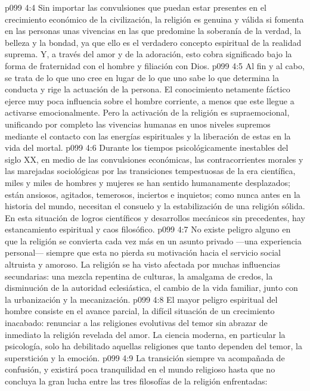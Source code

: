 \vs p099 4:4 Sin importar las convulsiones que puedan estar presentes en el crecimiento económico de la civilización, la religión es genuina y válida si fomenta en las personas unas vivencias en las que predomine la soberanía de la verdad, la belleza y la bondad, ya que ello es el verdadero concepto espiritual de la realidad suprema. Y, a través del amor y de la adoración, esto cobra significado bajo la forma de fraternidad con el hombre y filiación con Dios.
\vs p099 4:5 Al fin y al cabo, se trata de lo que uno cree en lugar de lo que uno sabe lo que determina la conducta y rige la actuación de la persona. El conocimiento netamente fáctico ejerce muy poca influencia sobre el hombre corriente, a menos que este llegue a activarse emocionalmente. Pero la activación de la religión es supraemocional, unificando por completo las vivencias humanas en unos niveles supremos mediante el contacto con las energías espirituales y la liberación de estas en la vida del mortal.
\vs p099 4:6 \pc Durante los tiempos psicológicamente inestables del siglo XX, en medio de las convulsiones económicas, las contracorrientes morales y las marejadas sociológicas por las transiciones tempestuosas de la era científica, miles y miles de hombres y mujeres se han sentido humanamente desplazados; están ansiosos, agitados, temerosos, inciertos e inquietos; como nunca antes en la historia del mundo, necesitan el consuelo y la estabilización de una religión sólida. En esta situación de logros científicos y desarrollos mecánicos sin precedentes, hay estancamiento espiritual y caos filosófico.
\vs p099 4:7 \pc No existe peligro alguno en que la religión se convierta cada vez más en un asunto privado ---una experiencia personal--- siempre que esta no pierda su motivación hacia el servicio social altruista y amoroso. La religión se ha visto afectada por muchas influencias secundarias: una mezcla repentina de culturas, la amalgama de credos, la disminución de la autoridad eclesiástica, el cambio de la vida familiar, junto con la urbanización y la mecanización.
\vs p099 4:8 El mayor peligro espiritual del hombre consiste en el avance parcial, la difícil situación de un crecimiento inacabado: renunciar a las religiones evolutivas del temor sin abrazar de inmediato la religión revelada del amor. La ciencia moderna, en particular la psicología, solo ha debilitado aquellas religiones que tanto dependen del temor, la superstición y la emoción.
\vs p099 4:9 La transición siempre va acompañada de confusión, y existirá poca tranquilidad en el mundo religioso hasta que no concluya la gran lucha entre las tres filosofías de la religión enfrentadas:

